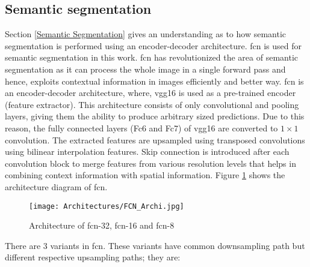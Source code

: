 \subsection{Semantic segmentation} \label{SS}

Section \ref{Semantic Segmentation} gives an understanding as to how semantic segmentation is performed using an encoder-decoder architecture. \ac{fcn} \cite{long2015fully} is used for semantic segmentation in this work. \ac{fcn} has revolutionized the area of semantic segmentation as it can process the whole image in a single forward pass and hence, exploits contextual information in images efficiently and better way. \ac{fcn} is an encoder-decoder architecture, where, \ac{vgg}16 is used as a pre-trained encoder (feature extractor). This architecture consists of only convolutional and pooling layers, giving them the ability to produce arbitrary sized predictions. Due to this reason, the fully connected layers (Fc6 and Fc7) of \ac{vgg}16 are converted to $1\times1$ convolution. The extracted features are upsampled using transposed convolutions using bilinear interpolation features. Skip connection is introduced after each convolution block to merge features from various resolution levels that helps in combining context information with spatial information. Figure \ref{FCN_Architecture} shows the architecture diagram of \ac{fcn}. 
 
\begin{figure}[h!]
    \centering
    \texttt{[image: Architectures/FCN\_Archi.jpg]}
    \caption{Architecture of \ac{fcn}-32, \ac{fcn}-16 and \ac{fcn}-8}
    \label{FCN_Architecture}
\end{figure}

There are 3 variants in \ac{fcn}. These variants have common downsampling path but different respective upsampling paths; they are:

